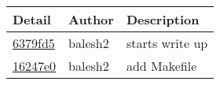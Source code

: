 \begin{tabular}{l l l}\textbf{Detail} & \textbf{Author} & \textbf{Description}\\\hline
\href{https://github.com/balesh2/CS444-3/commit/6379fd575b665ad1a2ee5b224fd9f2011d5eaa09}{6379fd5} & balesh2 & starts write up\\\hline
\href{https://github.com/balesh2/CS444-3/commit/16247e0cb5a258e35e2a2616ff265f9eb9d64c12}{16247e0} & balesh2 & add Makefile\\\hline\end{tabular}

